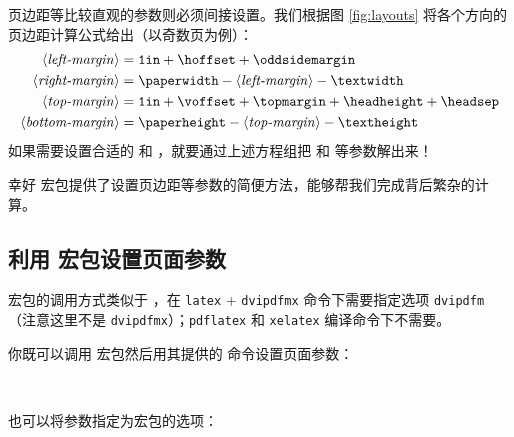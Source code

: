 页边距等比较直观的参数则必须间接设置。我们根据图 \ref{fig:layouts} 将各个方向的页边距计算公式给出（以奇数页为例）：
\begin{align*}
\text{\Arg{left-margin}}   &= \text{\ttfamily 1in}
                            + \text{\cmd{hoffset}}
                            + \text{\cmd{oddsidemargin}} \\
\text{\Arg{right-margin}}  &= \text{\cmd{paperwidth}}
                            - \text{\Arg{left-margin}}
                            - \text{\cmd{textwidth}} \\
\text{\Arg{top-margin}}    &= \text{\ttfamily 1in}
                            + \text{\cmd{voffset}}
                            + \text{\cmd{topmargin}}
                            + \text{\cmd{headheight}}
                            + \text{\cmd{headsep}} \\
\text{\Arg{bottom-margin}} &= \text{\cmd{paperheight}}
                            - \text{\Arg{top-margin}}
                            - \text{\cmd{textheight}}
\end{align*}
如果需要设置合适的  和 ，就要通过上述方程组把  和  等参数解出来！

幸好  宏包提供了设置页边距等参数的简便方法，能够帮我们完成背后繁杂的计算。

\subsection{利用  宏包设置页面参数}\label{subsec:geometry}

 宏包的调用方式类似于 ，在 \texttt{latex} + \texttt{dvipdfmx} 命令下需要指定选项 \texttt{dvipdfm}
（注意这里不是 \texttt{dvipdfmx}）；\texttt{pdflatex} 和 \texttt{xelatex} 编译命令下不需要。

你既可以调用  宏包然后用其提供的  命令设置页面参数：
\begin{command}
 \\
\end{command}

也可以将参数指定为宏包的选项：
\begin{command}
\end{command}

